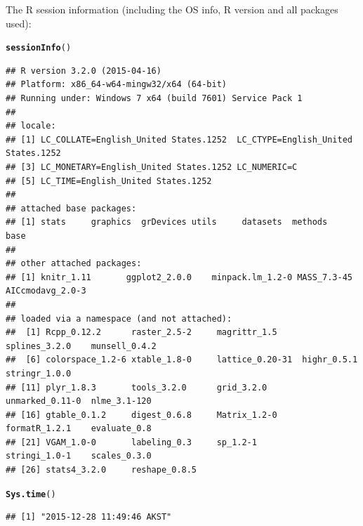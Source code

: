 \documentclass{article}\usepackage[]{graphicx}\usepackage[]{color}
\makeatletter
\newcommand{\hlstd}[1]{\textcolor[rgb]{0.345,0.345,0.345}{#1}}%
\newcommand{\hlkwd}[1]{\textcolor[rgb]{0.737,0.353,0.396}{\textbf{#1}}}%
\newenvironment{kframe}{%
 \def\at@end@of@kframe{}%
 \ifinner\ifhmode%
  \def\at@end@of@kframe{\end{minipage}}%
  \begin{minipage}{\columnwidth}%
 \fi\fi%
 \def\FrameCommand##1{\hskip\@totalleftmargin \hskip-\fboxsep
 \colorbox{shadecolor}{##1}\hskip-\fboxsep
     \hskip-\linewidth \hskip-\@totalleftmargin \hskip\columnwidth}%
 \MakeFramed {\advance\hsize-\width
   \@totalleftmargin\z@ \linewidth\hsize
   \@setminipage}}%
 {\par\unskip\endMakeFramed%
 \at@end@of@kframe}
\newenvironment{knitrout}{}{} %
\makeatother
\begin{document}
The R session information (including the OS info, R version and all
packages used):

\begin{knitrout}
\color{fgcolor}\begin{kframe}
\begin{alltt}
\hlkwd{sessionInfo}\hlstd{()}
\end{alltt}
\begin{verbatim}
## R version 3.2.0 (2015-04-16)
## Platform: x86_64-w64-mingw32/x64 (64-bit)
## Running under: Windows 7 x64 (build 7601) Service Pack 1
## 
## locale:
## [1] LC_COLLATE=English_United States.1252  LC_CTYPE=English_United States.1252   
## [3] LC_MONETARY=English_United States.1252 LC_NUMERIC=C                          
## [5] LC_TIME=English_United States.1252    
## 
## attached base packages:
## [1] stats     graphics  grDevices utils     datasets  methods   base     
## 
## other attached packages:
## [1] knitr_1.11       ggplot2_2.0.0    minpack.lm_1.2-0 MASS_7.3-45      AICcmodavg_2.0-3
## 
## loaded via a namespace (and not attached):
##  [1] Rcpp_0.12.2      raster_2.5-2     magrittr_1.5     splines_3.2.0    munsell_0.4.2   
##  [6] colorspace_1.2-6 xtable_1.8-0     lattice_0.20-31  highr_0.5.1      stringr_1.0.0   
## [11] plyr_1.8.3       tools_3.2.0      grid_3.2.0       unmarked_0.11-0  nlme_3.1-120    
## [16] gtable_0.1.2     digest_0.6.8     Matrix_1.2-0     formatR_1.2.1    evaluate_0.8    
## [21] VGAM_1.0-0       labeling_0.3     sp_1.2-1         stringi_1.0-1    scales_0.3.0    
## [26] stats4_3.2.0     reshape_0.8.5
\end{verbatim}
\begin{alltt}
\hlkwd{Sys.time}\hlstd{()}
\end{alltt}
\begin{verbatim}
## [1] "2015-12-28 11:49:46 AKST"
\end{verbatim}
\end{kframe}
\end{knitrout}
\end{document}
